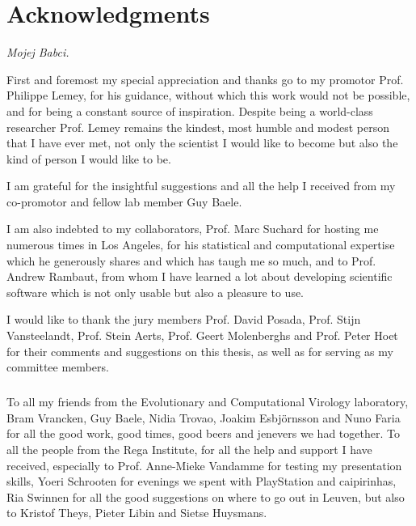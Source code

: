 
\chapter*{Acknowledgments}


\medskip{}

\begin{flushright}
\emph{Mojej Babci.}
\par\end{flushright}

\medskip{}

First and foremost my special appreciation and thanks go to my promotor Prof. Philippe Lemey, for his guidance, without which this work would not be possible, and for being a constant source of inspiration. 
Despite being a world-class researcher Prof. Lemey remains the kindest, most humble and modest person that I have ever met, not only the scientist I would like to become but also the kind of person I would like to
be.

I am grateful for the insightful suggestions and all the help I received from my co-promotor and fellow lab member Guy Baele.

I am also indebted to my collaborators, Prof. Marc Suchard for hosting me numerous times in Los Angeles, for his statistical and computational expertise which he generously shares and which has taugh me so much, and to Prof. Andrew Rambaut, from whom I have learned a lot about developing scientific software which is not only usable but also a pleasure to use.

I would like to thank the jury members Prof. David Posada, Prof. Stijn Vansteelandt, Prof. Stein Aerts, Prof. Geert Molenberghs and Prof. Peter Hoet for their comments and suggestions on this thesis, as well as for serving as my committee members.

\paragraph{} 
To all my friends from the Evolutionary and Computational Virology laboratory, Bram Vrancken, Guy Baele, Nidia Trovao, Joakim Esbj\"ornsson and Nuno Faria for all the good work, good times, good beers and jenevers we had together.
To all the people from the Rega Institute, for all the help and support I have received, especially to Prof. Anne-Mieke Vandamme for testing my presentation skills, Yoeri Schrooten for evenings we spent with PlayStation and caipirinhas, Ria Swinnen for all the good suggestions on where to go out in Leuven, but also to Kristof Theys, Pieter Libin and Sietse Huysmans.

